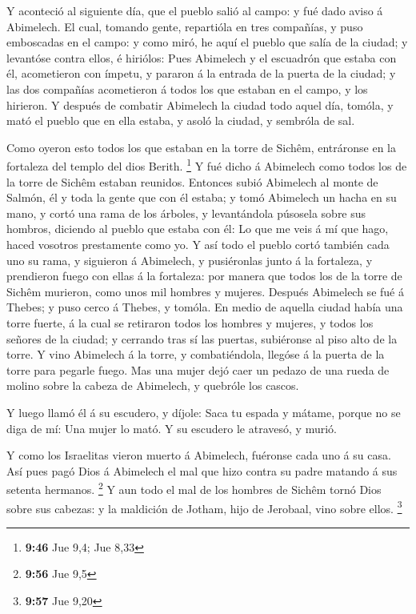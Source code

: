  Y aconteció al siguiente día, que el pueblo salió al
campo: y fué dado aviso á Abimelech.  El cual, tomando
gente, repartióla en tres compañías, y puso emboscadas en el campo: y
como miró, he aquí el pueblo que salía de la ciudad; y levantóse contra
ellos, é hiriólos:  Pues Abimelech y el escuadrón que
estaba con él, acometieron con ímpetu, y pararon á la entrada de la
puerta de la ciudad; y las dos compañías acometieron á todos los que
estaban en el campo, y los hirieron.  Y después de
combatir Abimelech la ciudad todo aquel día, tomóla, y mató el pueblo
que en ella estaba, y asoló la ciudad, y sembróla de sal.

 Como oyeron esto todos los que estaban en la torre de
Sichêm, entráronse en la fortaleza del templo del dios Berith.
\footnote{\textbf{9:46} Jue 9,4; Jue 8,33}  Y fué dicho á
Abimelech como todos los de la torre de Sichêm estaban reunidos.
 Entonces subió Abimelech al monte de Salmón, él y toda
la gente que con él estaba; y tomó Abimelech un hacha en su mano, y
cortó una rama de los árboles, y levantándola púsosela sobre sus
hombros, diciendo al pueblo que estaba con él: Lo que me veis á mí que
hago, haced vosotros prestamente como yo.  Y así todo el
pueblo cortó también cada uno su rama, y siguieron á Abimelech, y
pusiéronlas junto á la fortaleza, y prendieron fuego con ellas á la
fortaleza: por manera que todos los de la torre de Sichêm murieron, como
unos mil hombres y mujeres.  Después Abimelech se fué á
Thebes; y puso cerco á Thebes, y tomóla.  En medio de
aquella ciudad había una torre fuerte, á la cual se retiraron todos los
hombres y mujeres, y todos los señores de la ciudad; y cerrando tras sí
las puertas, subiéronse al piso alto de la torre.  Y vino
Abimelech á la torre, y combatiéndola, llegóse á la puerta de la torre
para pegarle fuego.  Mas una mujer dejó caer un pedazo de
una rueda de molino sobre la cabeza de Abimelech, y quebróle los cascos.

 Y luego llamó él á su escudero, y díjole: Saca tu espada
y mátame, porque no se diga de mí: Una mujer lo mató. Y su escudero le
atravesó, y murió.

 Y como los Israelitas vieron muerto á Abimelech,
fuéronse cada uno á su casa.  Así pues pagó Dios á
Abimelech el mal que hizo contra su padre matando á sus setenta
hermanos. \footnote{\textbf{9:56} Jue 9,5}  Y aun todo el
mal de los hombres de Sichêm tornó Dios sobre sus cabezas: y la
maldición de Jotham, hijo de Jerobaal, vino sobre ellos. \footnote{\textbf{9:57}
  Jue 9,20}

